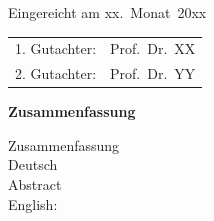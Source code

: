 \thispagestyle{empty}\vspace*{48em}

Eingereicht am xx.~Monat~20xx\vspace{1.5em}
\par{\large\begin{tabular}{ll}
 1. Gutachter: & Prof.~Dr.~XX \\
 2. Gutachter: & Prof.~Dr.~YY \\
\end{tabular}}


\newpage
\begin{center}\large\bfseries Zusammenfassung\end{center}

Zusammenfassung \\  
Deutsch \\

\vspace{20em}
Abstract \\ 
English: \\
 
 

\tableofcontents




